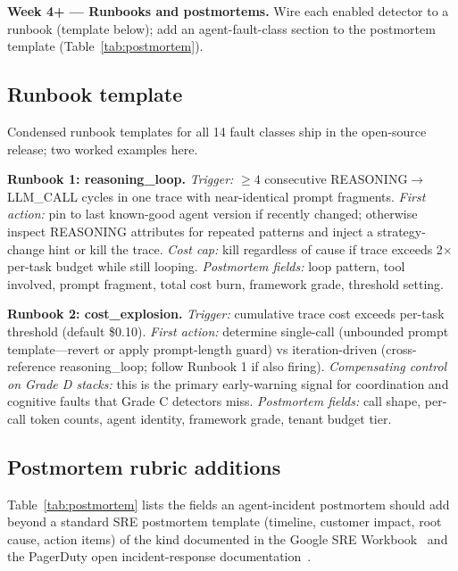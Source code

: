 \documentclass[conference]{IEEEtran}
\begin{document}
\noindent\textbf{Week 4+ --- Runbooks and postmortems.}
Wire each enabled detector to a runbook (template below); add an
agent-fault-class section to the postmortem template
(Table~\ref{tab:postmortem}).

\subsection{Runbook template}

Condensed runbook templates for all 14 fault classes ship in the
open-source release; two worked examples here.

\noindent\textbf{Runbook 1: reasoning\_loop.}
\emph{Trigger:} $\geq 4$ consecutive REASONING$\to$LLM\_CALL
cycles in one trace with near-identical prompt fragments.
\emph{First action:} pin to last known-good agent version if
recently changed; otherwise inspect REASONING attributes for
repeated patterns and inject a strategy-change hint or kill the
trace. \emph{Cost cap:} kill regardless of cause if trace exceeds
2$\times$ per-task budget while still looping. \emph{Postmortem
fields:} loop pattern, tool involved, prompt fragment, total cost
burn, framework grade, threshold setting.

\noindent\textbf{Runbook 2: cost\_explosion.}
\emph{Trigger:} cumulative trace cost exceeds per-task threshold
(default \$0.10). \emph{First action:} determine single-call
(unbounded prompt template---revert or apply prompt-length guard)
vs iteration-driven (cross-reference reasoning\_loop; follow
Runbook 1 if also firing). \emph{Compensating control on Grade D
stacks:} this is the primary early-warning signal for coordination
and cognitive faults that Grade C detectors miss.
\emph{Postmortem fields:} call shape, per-call token counts, agent
identity, framework grade, tenant budget tier.

\subsection{Postmortem rubric additions}

Table~\ref{tab:postmortem} lists the fields an agent-incident
postmortem should add beyond a standard SRE postmortem template
(timeline, customer impact, root cause, action items) of the kind
documented in the Google SRE Workbook~\cite{sre_workbook} and the
PagerDuty open incident-response documentation~\cite{pagerduty_ir}.
\end{document}
